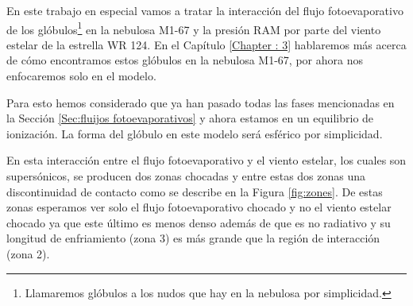 \documentclass{book}
\begin{document}
En este trabajo en especial vamos a tratar la interacción del flujo
fotoevaporativo de los glóbulos\footnote{Llamaremos glóbulos a los
nudos que hay en la nebulosa por simplicidad.} en la nebulosa M1-67 y
la presión RAM por parte del viento estelar de la estrella WR 124. En
el Capítulo \ref{Chapter : 3} hablaremos más acerca de cómo
encontramos estos glóbulos en la nebulosa M1-67, por ahora nos
enfocaremos solo en el modelo.

Para esto hemos considerado que ya han pasado todas las fases
mencionadas en la Sección \ref{Sec:fluijos fotoevaporativos} y ahora
estamos en un equilibrio de ionización. La forma del glóbulo en este
modelo será esférico por simplicidad.

En esta interacción entre el flujo fotoevaporativo y el viento
estelar, los cuales son supersónicos, se producen dos zonas chocadas y
entre estas dos zonas una discontinuidad de contacto como se describe
en la Figura \ref{fig:zones}. De estas zonas esperamos ver solo el
flujo fotoevaporativo chocado y no el viento estelar chocado ya que
este último es menos denso además de que es no radiativo y su longitud
de enfriamiento (zona 3) es más grande que la región de interacción
(zona 2).
\end{document}
